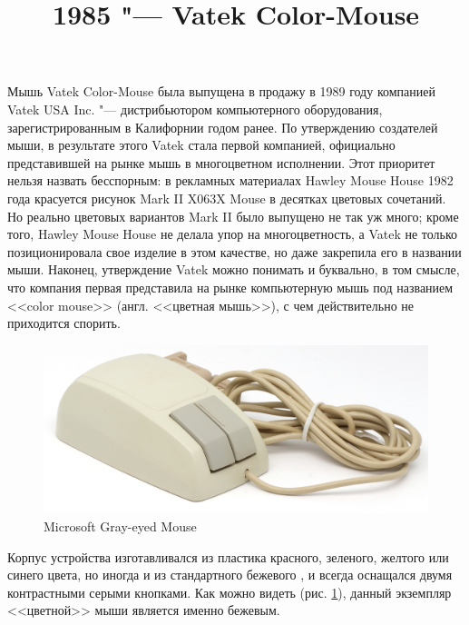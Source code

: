 \documentclass[11pt, a4paper]{article}
\begin{document}
\title{1985 "--- Vatek Color-Mouse}
\date{}
\maketitle
{}

Мышь Vatek Color-Mouse была выпущена в продажу в 1989 году компанией Vatek USA Inc. "--- дистрибьютором компьютерного оборудования, зарегистрированным в Калифорнии годом ранее. По утверждению создателей мыши, в результате этого Vatek стала первой компанией, официально представившей на рынке мышь в многоцветном исполнении. Этот приоритет нельзя назвать бесспорным: в рекламных материалах Hawley Mouse House 1982 года красуется рисунок  Mark II X063X Mouse в десятках цветовых сочетаний. Но реально цветовых вариантов Mark II было выпущено не так уж много; кроме того, Hawley Mouse House не делала упор на многоцветность, а Vatek не только позиционировала свое изделие в этом качестве, но даже закрепила его в названии мыши. Наконец, утверждение Vatek можно понимать и буквально, в том смысле, что компания первая представила на рынке компьютерную мышь под названием <<color mouse>> (англ. <<цветная мышь>>), с чем действительно не приходится спорить.

\begin{figure}[h]
   \centering
    \includegraphics[scale=0.45]{1989_vatek_color_mouse/pic_30.jpg}
    \caption{Microsoft Gray-eyed Mouse}
    \label{fig:VatekColorPic}
\end{figure}

Корпус устройства изготавливался из пластика красного, зеленого, желтого или синего цвета, но иногда и из стандартного бежевого \cite{mouses}, и всегда оснащался двумя контрастными серыми кнопками. Как можно видеть (рис. \ref{fig:VatekColorPic}), данный экземпляр <<цветной>> мыши является именно бежевым.
\end{document}
